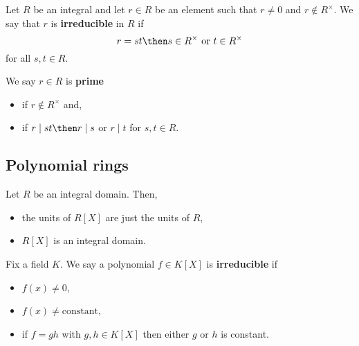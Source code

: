 \documentclass[12pt, a4paper]{article}
\begin{document}
\begin{definition}
    Let \(R\) be an integral and let \(r\in R\) be an element such that \(r\neq 0\) and \(r\not\in  R^{\times}\). We say that \(r\) is \textbf{irreducible} in \(R\) if 
    \[r=st \then s\in R^{\times} \text{ or } t\in R^{\times}\]
    for all \(s,t\in R\).
\end{definition}

\begin{definition}
    We say \(r\in R\) is \textbf{prime} 
    \begin{itemize}
        \item if \(r\not\in R^{\times}\) and,
        \item if \(r\mid st \then r\mid s\) or \(r\mid t\) for \(s,t\in R\).
    \end{itemize}
\end{definition}

\subsection{Polynomial rings}

\begin{mdprop}
    Let \(R\) be an integral domain. Then,
    \begin{itemize}
        \item the units of \(R[X]\) are just the units of \(R\),
        \item \(R[X]\) is an integral domain.
    \end{itemize}
\end{mdprop}

\begin{definition}
    Fix a field \(K\). We say a polynomial \(f\in K[X]\) is \textbf{irreducible} if 
    \begin{itemize}
        \item \(f(x)\neq 0\),
        \item \(f(x)\neq \text{constant}\),
        \item if \(f=gh\) with \(g,h\in K[X]\) then either \(g\) or \(h\) is constant.
    \end{itemize}
\end{definition}

\end{document}
